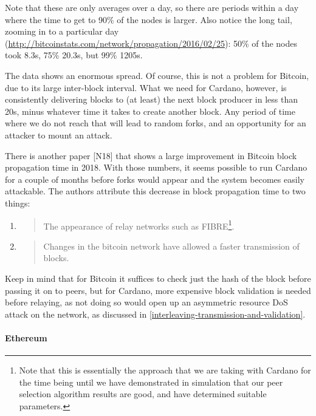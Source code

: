 \documentclass[11pt,a4paper]{article}
\begin{document}
Note that these are only averages over a day, so there are periods
within a day where the time to get to 90\% of the nodes is larger. Also
notice the long tail, zooming in to a particular day
(\href{http://bitcoinstats.com/network/propagation/2016/02/25}{{http://bitcoinstats.com/network/propagation/2016/02/25}}):
50\% of the nodes took 8.3s, 75\% 20.3s, but 99\% 1205s.

The data shows an enormous spread. Of course, this is not a problem for
Bitcoin, due to its large inter-block interval. What we need for
Cardano, however, is consistently delivering blocks to (at least) the
next block producer in less than 20s, minus whatever time it takes to
create another block. Any period of time where we do not reach that will
lead to random forks, and an opportunity for an attacker to mount an
attack.

There is another paper {[}N18{]} that shows a large improvement in
Bitcoin block propagation time in 2018. With those numbers, it seems
possible to run Cardano for a couple of months before forks would appear
and the system becomes easily attackable. The authors attribute this
decrease in block propagation time to two things:

\begin{enumerate}
\def\labelenumi{\arabic{enumi}.}
\item
  \begin{quote}
  The appearance of relay networks such as FIBRE\footnote{Note that this
    is essentially the approach that we are taking with Cardano for the
    time being until we have demonstrated in simulation that our peer
    selection algorithm results are good, and have determined suitable
    parameters.}.
  \end{quote}
\item
  \begin{quote}
  Changes in the bitcoin network have allowed a faster transmission of
  blocks.
  \end{quote}
\end{enumerate}

Keep in mind that for Bitcoin it suffices to check just the hash of the
block before passing it on to peers, but for Cardano, more expensive
block validation is needed before relaying, as not doing so would open
up an asymmetric resource DoS attack on the network, as discussed in
\cref{interleaving-transmission-and-validation}.

\paragraph{Ethereum}
\label{ethereum}
\end{document}
